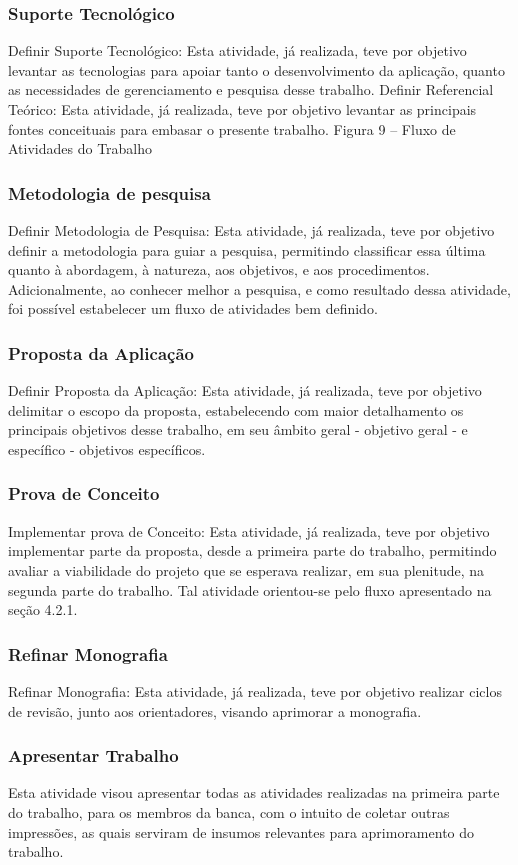 \subsubsection{Suporte Tecnológico}
Definir Suporte Tecnológico: Esta atividade, já realizada, teve por objetivo
levantar as tecnologias para apoiar tanto o desenvolvimento da aplicação, quanto as necessidades de gerenciamento e pesquisa desse trabalho.
Definir Referencial Teórico: Esta atividade, já realizada, teve por objetivo
levantar as principais fontes conceituais para embasar o presente trabalho.
Figura 9 – Fluxo de Atividades do Trabalho
\subsubsection{Metodologia de pesquisa}
Definir Metodologia de Pesquisa: Esta atividade, já realizada, teve por objetivo definir a metodologia para guiar a pesquisa, permitindo classificar essa última quanto
à abordagem, à natureza, aos objetivos, e aos procedimentos. Adicionalmente, ao conhecer
melhor a pesquisa, e como resultado dessa atividade, foi possível estabelecer um fluxo de
atividades bem definido.
\subsubsection{Proposta da Aplicação}
Definir Proposta da Aplicação: Esta atividade, já realizada, teve por objetivo
delimitar o escopo da proposta, estabelecendo com maior detalhamento os principais
objetivos desse trabalho, em seu âmbito geral - objetivo geral - e específico - objetivos
específicos.
\subsubsection{Prova de Conceito}
Implementar prova de Conceito: Esta atividade, já realizada, teve por objetivo
implementar parte da proposta, desde a primeira parte do trabalho, permitindo avaliar
a viabilidade do projeto que se esperava realizar, em sua plenitude, na segunda parte do
trabalho. Tal atividade orientou-se pelo fluxo apresentado na seção 4.2.1.

\subsubsection{Refinar Monografia}
Refinar Monografia: Esta atividade, já realizada, teve por objetivo realizar ciclos
de revisão, junto aos orientadores, visando aprimorar a monografia.

\subsubsection{Apresentar Trabalho}
Esta atividade visou apresentar todas as atividades realizadas na primeira parte do trabalho, para os membros da banca, com o intuito de
coletar outras impressões, as quais serviram de insumos relevantes para aprimoramento
do trabalho.

